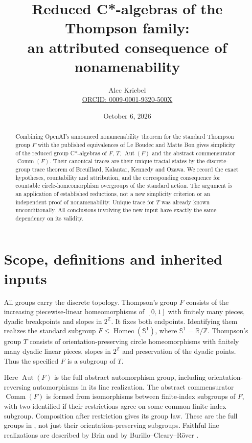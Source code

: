 \documentclass[11pt]{article}
\title{Reduced C*-algebras of the Thompson family:\\ an attributed consequence of nonamenability}
\author{Alec Kriebel\\\small\href{https://orcid.org/0009-0001-9320-500X}{ORCID: 0009-0001-9320-500X}}
\date{October 6, 2026}
\newcommand{\Aut}{\operatorname{Aut}}
\newcommand{\Comm}{\operatorname{Comm}}
\newcommand{\Homeo}{\operatorname{Homeo}}
\begin{document}
\maketitle
\begin{abstract}
Combining OpenAI's announced nonamenability theorem for the standard Thompson group $F$ with the published equivalences of Le Boudec and Matte Bon gives simplicity of the reduced group C*-algebras of $F$, $T$, $\Aut(F)$ and the abstract commensurator $\Comm(F)$. Their canonical traces are their unique tracial states by the discrete-group trace theorem of Breuillard, Kalantar, Kennedy and Ozawa. We record the exact hypotheses, countability and attribution, and the corresponding consequence for countable circle-homeomorphism overgroups of the standard action. The argument is an application of established reductions, not a new simplicity criterion or an independent proof of nonamenability. Unique trace for $T$ was already known unconditionally. All conclusions involving the new input have exactly the same dependency on its validity.
\end{abstract}

\section{Scope, definitions and inherited inputs}
All groups carry the discrete topology. Thompson's group $F$ consists of the increasing piecewise-linear homeomorphisms of $[0,1]$ with finitely many pieces, dyadic breakpoints and slopes in $2^{\mathbb Z}$. It fixes both endpoints. Identifying them realizes the standard subgroup $F\leq\Homeo(\mathbb S^1)$, where $\mathbb S^1=\mathbb R/\mathbb Z$. Thompson's group $T$ consists of orientation-preserving circle homeomorphisms with finitely many dyadic linear pieces, slopes in $2^{\mathbb Z}$ and preservation of the dyadic points. Thus the specified $F$ is a subgroup of $T$.

Here $\Aut(F)$ is the full abstract automorphism group, including orientation-reversing automorphisms in its line realization. The abstract commensurator $\Comm(F)$ is formed from isomorphisms between finite-index subgroups of $F$, with two identified if their restrictions agree on some common finite-index subgroup. Composition after restriction gives its group law. These are the full groups in \cite[Corollary~4.4]{LMB}, not just their orientation-preserving subgroups. Faithful line realizations are described by Brin and by Burillo--Cleary--R\"over \cite{Brin,BCR}.
\end{document}
